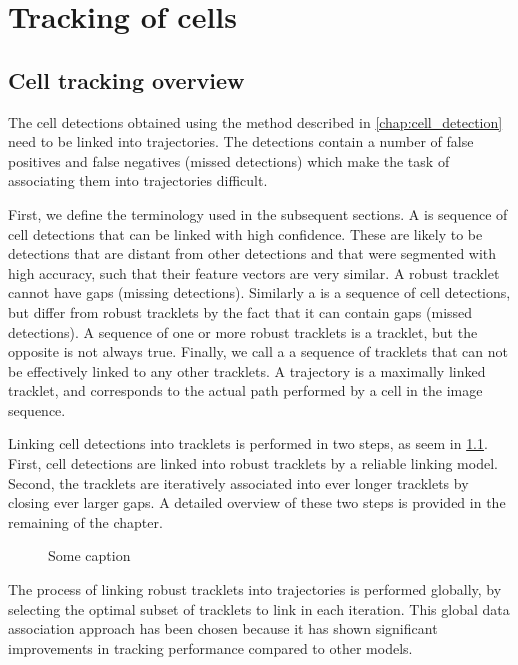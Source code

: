 \chapter{Tracking of cells \statusfirstdraft}
	
	\section{Cell tracking overview \statusfirstdraft}
	
		The cell detections obtained using the method described in \cref{chap:cell_detection} need to be linked into trajectories. The detections contain a number of false positives and false negatives (missed detections) which make the task of associating them into trajectories difficult.
		
		First, we define the terminology used in the subsequent sections. A  is sequence of cell detections that can be linked with high confidence. These are likely to be detections that are distant from other detections and that were segmented with high accuracy, such that their feature vectors are very similar. A robust tracklet cannot have gaps (missing detections). Similarly a  is a sequence of cell detections, but differ from robust tracklets by the fact that it can contain gaps (missed detections). A sequence of one or more robust tracklets is a tracklet, but the opposite is not always true. Finally, we call a  a sequence of tracklets that can not be effectively linked to any other tracklets. A trajectory is a maximally linked tracklet, and corresponds to the actual path performed by a cell in the image sequence.
		
		Linking cell detections into tracklets is performed in two steps, as seem in \cref{fig:trackingoveriew}. First, cell detections are linked into robust tracklets by a reliable linking model. Second, the tracklets are iteratively  associated into ever longer tracklets by closing ever larger gaps. A detailed overview of these two steps is provided in the remaining of the chapter.
	
		\begin{figure}[h]
			\centering
			\caption{Some caption}
			\label{fig:trackingoveriew}
		\end{figure}
		
		The process of linking robust tracklets into trajectories is performed globally, by selecting the optimal subset of tracklets to link in each iteration. This global data association approach has been chosen because it has shown significant improvements in tracking performance compared to other models. 
		
